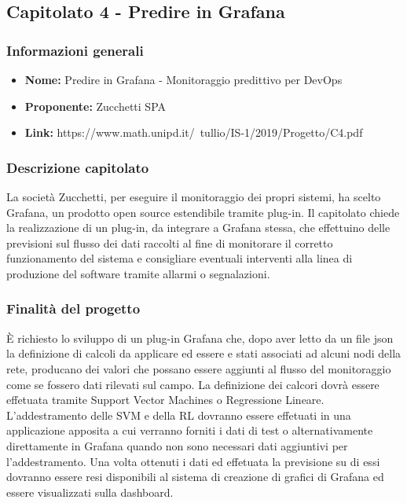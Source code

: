 
\subsection{Capitolato 4 - Predire in Grafana}

		\subsubsection{Informazioni generali}
			\begin{itemize} %
			  \item \textbf{Nome:} Predire in Grafana - Monitoraggio predittivo per DevOps
			  \item \textbf{Proponente:} Zucchetti SPA
			  \item \textbf{Link:} https://www.math.unipd.it/~tullio/IS-1/2019/Progetto/C4.pdf
			\end{itemize}
		
		\subsubsection{Descrizione capitolato}
			La società Zucchetti, per eseguire il monitoraggio dei propri sistemi, ha scelto Grafana, un prodotto open source estendibile tramite plug-in.
			Il capitolato chiede la realizzazione di un plug-in, da integrare a Grafana stessa, che effettuino delle previsioni sul flusso dei dati raccolti al fine di monitorare il corretto funzionamento del sistema e consigliare eventuali interventi alla linea di produzione del software tramite allarmi o segnalazioni.
		
		\subsubsection{Finalità del progetto}
			È richiesto lo sviluppo di un plug-in Grafana che, dopo aver letto da un file json la definizione di calcoli da applicare ed essere e stati associati ad alcuni nodi della rete, producano dei valori che possano essere aggiunti al flusso del monitoraggio come se fossero dati rilevati sul campo.
			La definizione dei calcori dovrà essere effetuata tramite Support Vector Machines o Regressione Lineare. L’addestramento delle SVM e della RL dovranno essere effetuati in una applicazione apposita a cui verranno forniti i dati di test o alternativamente direttamente in Grafana quando non sono necessari dati aggiuntivi per l’addestramento.
			Una volta ottenuti i dati ed effetuata la previsione su di essi dovranno essere resi disponibili al sistema di creazione di grafici di Grafana ed essere visualizzati sulla dashboard.
		
